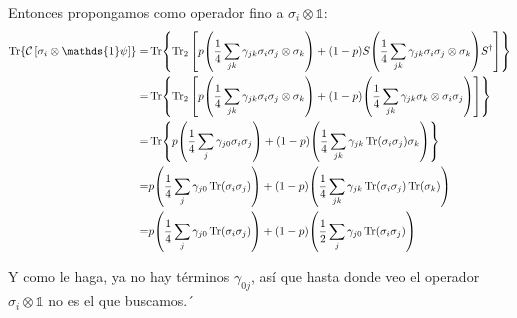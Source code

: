 \documentclass[onecolumn,11pt]{article}
\newcommand{\mcC}{\mathcal{C}}
\newcommand{\Id}{\mathds{1}}%
\newcommand{\CG}[1]{\mcC\left[#1\right]}
\begin{document}
Entonces propongamos como operador fino a $\sigma_{i}\otimes\Id$:
\begin{align*}
\Tr{\CG{\sigma_{i}\otimes\Id\psi}}=&\Tr{\Tr_{2}{\qty[p\qty(\frac{1}{4}\sum_{jk}\gamma_{jk}\sigma_{i}\sigma_{j}\otimes\sigma_{k})+(1-p)S\qty(\frac{1}{4}\sum_{jk}\gamma_{jk}\sigma_{i}\sigma_{j}\otimes\sigma_{k})S^{\dag}]}}\\
=&\Tr{\Tr_{2}{\qty[p\qty(\frac{1}{4}\sum_{jk}\gamma_{jk}\sigma_{i}\sigma_{j}\otimes\sigma_{k})+(1-p)\qty(\frac{1}{4}\sum_{jk}\gamma_{jk}\sigma_{k}\otimes\sigma_{i}\sigma_{j})]}}\\
=&\Tr{p\qty(\frac{1}{4}\sum_{j}\gamma_{j0}\sigma_{i}\sigma_{j})+(1-p)\qty(\frac{1}{4}\sum_{jk}\gamma_{jk}\Tr(\sigma_{i}\sigma_{j})\sigma_{k})}\\
=&p\qty(\frac{1}{4}\sum_{j}\gamma_{j0}\Tr(\sigma_{i}\sigma_{j}))+(1-p)\qty(\frac{1}{4}\sum_{jk}\gamma_{jk}\Tr(\sigma_{i}\sigma_{j})\Tr(\sigma_{k}))\\
=&p\qty(\frac{1}{4}\sum_{j}\gamma_{j0}\Tr(\sigma_{i}\sigma_{j}))+(1-p)\qty(\frac{1}{2}\sum_{j}\gamma_{j0}\Tr(\sigma_{i}\sigma_{j}))\\
\end{align*}

Y como le haga, ya no hay términos $\gamma_{0j}$, así que hasta donde veo el operador $\sigma_{i}\otimes\Id$ no es el que buscamos.´


\end{document}
